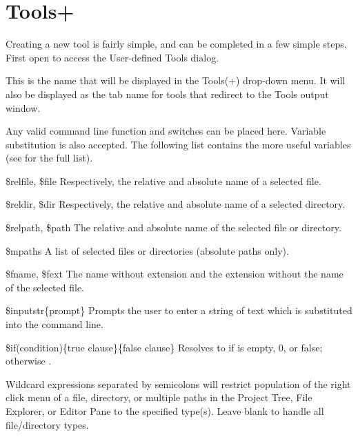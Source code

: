 \section{Tools+}\label{sec:tools+}

Creating a new tool is fairly simple, and can be completed in a few simple steps. First open  to access the User-defined Tools dialog.



This is the name that will be displayed in the Tools(+) drop-down menu. It will also be displayed as the tab name for tools that redirect to the Tools output window.


Any valid command line function and switches can be placed here. Variable substitution is also accepted. The following list contains the more useful variables (see  for the full list).

\begin{codeentry}
\item[\$relfile, \$file] Respectively, the relative and absolute name of a selected file.
\item[\$reldir, \$dir] Respectively, the relative and absolute name of a selected directory.
\item[\$relpath, \$path] The relative and absolute name of the selected file or directory.
\item[\$mpaths] A list of selected files or directories (absolute paths only).
\item[\$fname, \$fext] The name without extension and the extension without the name of the selected file.
\item[\$inputstr\{prompt\}] Prompts the user to enter a string of text which is substituted into the command line.
\item[\$if(condition)\{true clause\}\{false clause\}] Resolves to  if  is empty, 0, or false; otherwise .
\end{codeentry}


Wildcard expressions separated by semicolons will restrict population of the right click menu of a file, directory, or multiple paths in the Project Tree, File Explorer, or Editor Pane to the specified type(s). Leave blank to handle all file/directory types.

